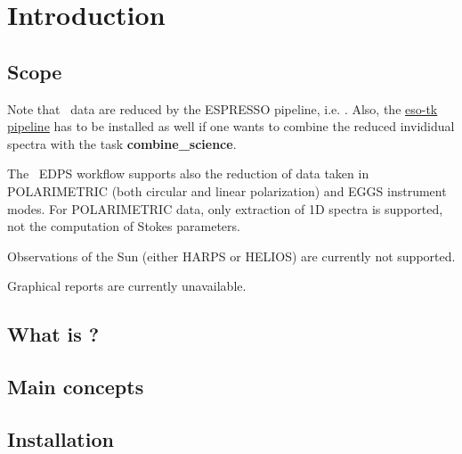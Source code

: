 \section{Introduction}

\subsection{Scope}


Note that \instname\ data are reduced by the ESPRESSO pipeline, i.e. \pipename.
Also, the  \href{https://www.eso.org/sci/software/pipelines/esotk/esotk-pipe-recipes.html}{eso-tk pipeline} has to be installed as well if one wants to combine the reduced invididual spectra with the task {\bf combine\_science}.

The \instname\ EDPS workflow supports also the reduction of data taken in POLARIMETRIC (both circular and linear polarization) and EGGS instrument modes. For POLARIMETRIC data, only extraction
of 1D spectra is supported, not the computation of Stokes parameters.

Observations of the Sun (either HARPS or HELIOS)  are currently not supported.

Graphical reports are currently unavailable.

\subsection{What is \edps?}
\label{sec:what_is_edps}


\subsection{Main concepts}
\label{sec:main_concepts}


\subsection{Installation}
\label{sec:installation}

